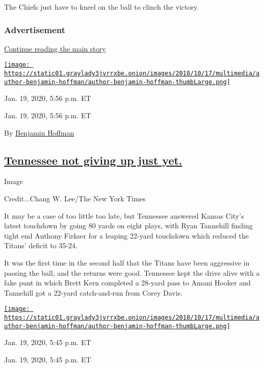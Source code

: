The Chiefs just have to kneel on the ball to clinch the victory.

\hypertarget{advertisement}{%
\subsubsection{Advertisement}\label{advertisement}}

\protect\hyperlink{after-dfp-ad-mid1}{Continue reading the main story}

\href{https://www.nytimes3xbfgragh.onion/by/benjamin-hoffman}{\texttt{[image: https://static01.graylady3jvrrxbe.onion/images/2018/10/17/multimedia/author-benjamin-hoffman/author-benjamin-hoffman-thumbLarge.png]}}

Jan. 19, 2020, 5:56 p.m. ET

Jan. 19, 2020, 5:56 p.m. ET

By
\href{https://www.nytimes3xbfgragh.onion/by/benjamin-hoffman}{Benjamin
Hoffman}

\hypertarget{tennessee-not-giving-up-just-yet}{%
\subsection{\texorpdfstring{\protect\hyperlink{tennessee-not-giving-up-just-yet}{Tennessee
not giving up just
yet.}}{Tennessee not giving up just yet.}}\label{tennessee-not-giving-up-just-yet}}

Image

Credit...Chang W. Lee/The New York Times

It may be a case of too little too late, but Tennessee answered Kansas
City's latest touchdown by going 80 yards on eight plays, with Ryan
Tannehill finding tight end Anthony Firkser for a leaping 22-yard
touchdown which reduced the Titans' deficit to 35-24.

It was the first time in the second half that the Titans have been
aggressive in passing the ball, and the returns were good. Tennessee
kept the drive alive with a fake punt in which Brett Kern completed a
28-yard pass to Amani Hooker and Tannehill got a 22-yard catch-and-run
from Corey Davis.

\href{https://www.nytimes3xbfgragh.onion/by/benjamin-hoffman}{\texttt{[image: https://static01.graylady3jvrrxbe.onion/images/2018/10/17/multimedia/author-benjamin-hoffman/author-benjamin-hoffman-thumbLarge.png]}}

Jan. 19, 2020, 5:45 p.m. ET

Jan. 19, 2020, 5:45 p.m. ET

